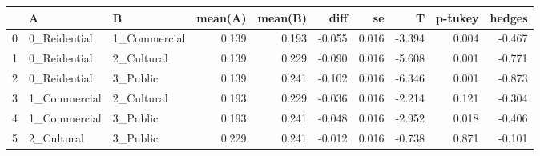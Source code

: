 \begin{tabular}{lllrrrrrrr}
\toprule
{} &             A &             B &  mean(A) &  mean(B) &   diff &     se &      T &  p-tukey &  hedges \\
\midrule
0 &  0\_Reidential &  1\_Commercial &    0.139 &    0.193 & -0.055 &  0.016 & -3.394 &    0.004 &  -0.467 \\
1 &  0\_Reidential &    2\_Cultural &    0.139 &    0.229 & -0.090 &  0.016 & -5.608 &    0.001 &  -0.771 \\
2 &  0\_Reidential &      3\_Public &    0.139 &    0.241 & -0.102 &  0.016 & -6.346 &    0.001 &  -0.873 \\
3 &  1\_Commercial &    2\_Cultural &    0.193 &    0.229 & -0.036 &  0.016 & -2.214 &    0.121 &  -0.304 \\
4 &  1\_Commercial &      3\_Public &    0.193 &    0.241 & -0.048 &  0.016 & -2.952 &    0.018 &  -0.406 \\
5 &    2\_Cultural &      3\_Public &    0.229 &    0.241 & -0.012 &  0.016 & -0.738 &    0.871 &  -0.101 \\
\bottomrule
\end{tabular}
